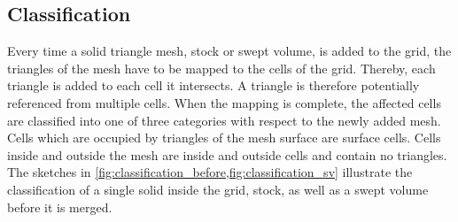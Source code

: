 \subsection{Classification}
\label{sec:classification}

Every time a solid triangle mesh, stock or swept volume, is added to the grid, the triangles of the mesh have to be mapped to the cells of the grid.
Thereby, each triangle is added to each cell it intersects.
A triangle is therefore potentially referenced from multiple cells.
When the mapping is complete, the affected cells are classified into one of three categories with respect to the newly added mesh.
Cells which are occupied by triangles of the mesh surface are surface cells.
Cells inside and outside the mesh are inside and outside cells and contain no triangles.
The sketches in \cref{fig:classification_before,fig:classification_sv} illustrate the classification of a single solid inside the grid, \ie stock, as well as a swept volume before it is merged.


